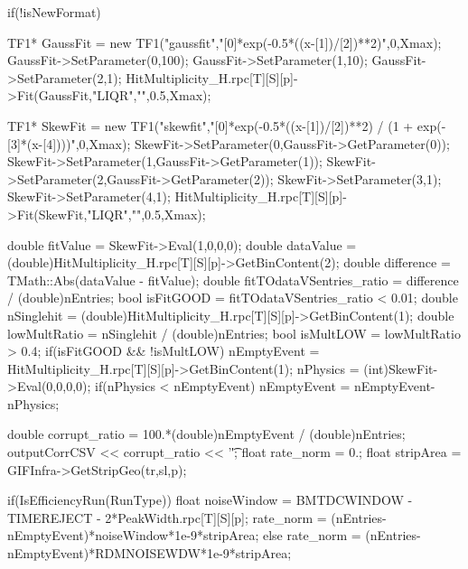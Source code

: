 	\begin{code}
	\begin{cppcode}
if(!isNewFormat){
	TF1* GaussFit = new TF1("gaussfit","[0]*exp(-0.5*((x-[1])/[2])**2)",0,Xmax);
	GaussFit->SetParameter(0,100);
	GaussFit->SetParameter(1,10);
	GaussFit->SetParameter(2,1);
	HitMultiplicity_H.rpc[T][S][p]->Fit(GaussFit,"LIQR","",0.5,Xmax);

	TF1* SkewFit = new TF1("skewfit","[0]*exp(-0.5*((x-[1])/[2])**2) / (1 + exp(-[3]*(x-[4])))",0,Xmax);
	SkewFit->SetParameter(0,GaussFit->GetParameter(0));
	SkewFit->SetParameter(1,GaussFit->GetParameter(1));
	SkewFit->SetParameter(2,GaussFit->GetParameter(2));
	SkewFit->SetParameter(3,1);
	SkewFit->SetParameter(4,1);
	HitMultiplicity_H.rpc[T][S][p]->Fit(SkewFit,"LIQR","",0.5,Xmax);

	double fitValue = SkewFit->Eval(1,0,0,0);
	double dataValue = (double)HitMultiplicity_H.rpc[T][S][p]->GetBinContent(2);
	double difference = TMath::Abs(dataValue - fitValue);
	double fitTOdataVSentries_ratio = difference / (double)nEntries;
	bool isFitGOOD = fitTOdataVSentries_ratio < 0.01;
	double nSinglehit = (double)HitMultiplicity_H.rpc[T][S][p]->GetBinContent(1);
	double lowMultRatio = nSinglehit / (double)nEntries;
	bool isMultLOW = lowMultRatio > 0.4;
	if(isFitGOOD && !isMultLOW){
		nEmptyEvent = HitMultiplicity_H.rpc[T][S][p]->GetBinContent(1);
		nPhysics = (int)SkewFit->Eval(0,0,0,0);
		if(nPhysics < nEmptyEvent)
		nEmptyEvent = nEmptyEvent-nPhysics;
	}
}
double corrupt_ratio = 100.*(double)nEmptyEvent / (double)nEntries;
outputCorrCSV << corrupt_ratio << '\t';
float rate_norm = 0.;
float stripArea = GIFInfra->GetStripGeo(tr,sl,p);	
	
if(IsEfficiencyRun(RunType)){
	float noiseWindow = BMTDCWINDOW - TIMEREJECT - 2*PeakWidth.rpc[T][S][p];
	rate_norm = (nEntries-nEmptyEvent)*noiseWindow*1e-9*stripArea;
} else
	rate_norm = (nEntries-nEmptyEvent)*RDMNOISEWDW*1e-9*stripArea;
	\end{cppcode}
	\label{cpp:rate_norm}
	\vspace{5mm}
	\end{code}
	

